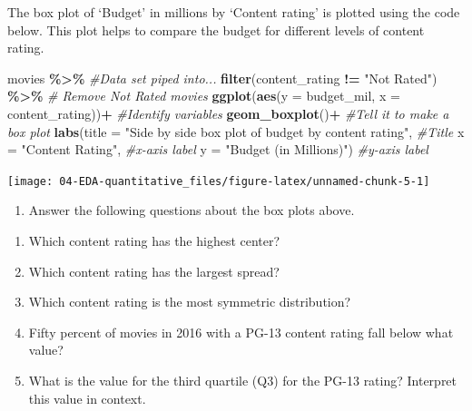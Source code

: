 \documentclass[
]{report}
\newenvironment{Shaded}{\begin{snugshade}}{\end{snugshade}}
\newcommand{\CommentTok}[1]{\textcolor[rgb]{0.56,0.35,0.01}{\textit{#1}}}
\newcommand{\DataTypeTok}[1]{\textcolor[rgb]{0.13,0.29,0.53}{#1}}
\newcommand{\KeywordTok}[1]{\textcolor[rgb]{0.13,0.29,0.53}{\textbf{#1}}}
\newcommand{\NormalTok}[1]{#1}
\newcommand{\OperatorTok}[1]{\textcolor[rgb]{0.81,0.36,0.00}{\textbf{#1}}}
\newcommand{\StringTok}[1]{\textcolor[rgb]{0.31,0.60,0.02}{#1}}
\providecommand{\tightlist}{%
  \setlength{\itemsep}{0pt}\setlength{\parskip}{0pt}}
\begin{document}
The box plot of `Budget' in millions by `Content rating' is plotted using the code below. This plot helps to compare the budget for different levels of content rating.

\begin{Shaded}
\begin{Highlighting}[]
\NormalTok{movies }\OperatorTok{\%\textgreater{}\%}\StringTok{  }\CommentTok{\#Data set piped into...}
\StringTok{  }\KeywordTok{filter}\NormalTok{(content\_rating }\OperatorTok{!=}\StringTok{ "Not Rated"}\NormalTok{) }\OperatorTok{\%\textgreater{}\%}\StringTok{ }\CommentTok{\# Remove Not Rated movies}
\StringTok{  }\KeywordTok{ggplot}\NormalTok{(}\KeywordTok{aes}\NormalTok{(}\DataTypeTok{y =}\NormalTok{ budget\_mil, }\DataTypeTok{x =}\NormalTok{ content\_rating))}\OperatorTok{+}\StringTok{  }\CommentTok{\#Identify variables}
\StringTok{  }\KeywordTok{geom\_boxplot}\NormalTok{()}\OperatorTok{+}\StringTok{  }\CommentTok{\#Tell it to make a box plot}
\StringTok{  }\KeywordTok{labs}\NormalTok{(}\DataTypeTok{title =} \StringTok{"Side by side box plot of budget by content rating"}\NormalTok{,  }\CommentTok{\#Title}
       \DataTypeTok{x =} \StringTok{"Content Rating"}\NormalTok{,    }\CommentTok{\#x{-}axis label}
       \DataTypeTok{y =} \StringTok{"Budget (in Millions)"}\NormalTok{)  }\CommentTok{\#y{-}axis label}
\end{Highlighting}
\end{Shaded}

\begin{center}\texttt{[image: 04-EDA-quantitative\_files/figure-latex/unnamed-chunk-5-1]} \end{center}

\begin{enumerate}
\def\labelenumi{\arabic{enumi}.}
\setcounter{enumi}{11}
\tightlist
\item
  Answer the following questions about the box plots above.
\end{enumerate}

\begin{enumerate}
\def\labelenumi{\alph{enumi}.}
\item
  Which content rating has the highest center?
  \vspace{0.2in}
\item
  Which content rating has the largest spread?
  \vspace{0.2in}
\item
  Which content rating is the most symmetric distribution?
  \vspace{0.2in}
\item
  Fifty percent of movies in 2016 with a PG-13 content rating fall below what value?
  \vspace{0.2in}
\item
  What is the value for the third quartile (Q3) for the PG-13 rating? Interpret this value in context.
  \vspace{.5in}
\end{enumerate}
\end{document}
